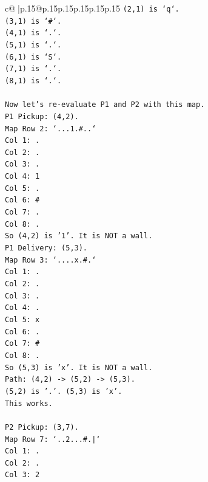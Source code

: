 \documentclass{article}
\begin{document}
{\begin{supertabular}{c@{$\;$}|p{.15\linewidth}@{}p{.15\linewidth}p{.15\linewidth}p{.15\linewidth}p{.15\linewidth}p{.15\linewidth}}
{{{\texttt{(2,1) is `q`.} \\
\texttt{(3,1) is `\#`.} \\
\texttt{(4,1) is `.`.} \\
\texttt{(5,1) is `.`.} \\
\texttt{(6,1) is `S`.} \\
\texttt{(7,1) is `.`.} \\
\texttt{(8,1) is `.`.} \\
\\ 
\texttt{Now let's re{-}evaluate P1 and P2 with this map.} \\
\texttt{P1 Pickup: (4,2).} \\
\texttt{Map Row 2: `...1.\#..`} \\
\texttt{Col 1: .} \\
\texttt{Col 2: .} \\
\texttt{Col 3: .} \\
\texttt{Col 4: 1} \\
\texttt{Col 5: .} \\
\texttt{Col 6: \#} \\
\texttt{Col 7: .} \\
\texttt{Col 8: .} \\
\texttt{So (4,2) is '1'. It is NOT a wall.} \\
\texttt{P1 Delivery: (5,3).} \\
\texttt{Map Row 3: `....x.\#.`} \\
\texttt{Col 1: .} \\
\texttt{Col 2: .} \\
\texttt{Col 3: .} \\
\texttt{Col 4: .} \\
\texttt{Col 5: x} \\
\texttt{Col 6: .} \\
\texttt{Col 7: \#} \\
\texttt{Col 8: .} \\
\texttt{So (5,3) is 'x'. It is NOT a wall.} \\
\texttt{Path: (4,2) {-}> (5,2) {-}> (5,3).} \\
\texttt{(5,2) is '.'. (5,3) is 'x'.} \\
\texttt{This works.} \\
\\ 
\texttt{P2 Pickup: (3,7).} \\
\texttt{Map Row 7: `..2...\#.|`} \\
\texttt{Col 1: .} \\
\texttt{Col 2: .} \\
\texttt{Col 3: 2} \\
}}}
\end{supertabular}}
\end{document}
